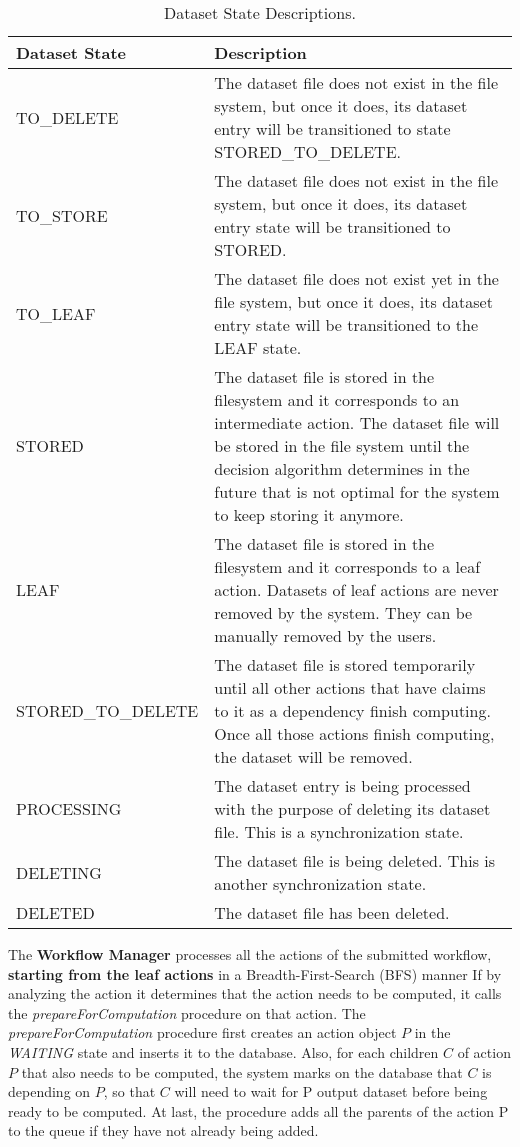 \begin{table}
\begin{tabular}{| l | p{12cm} |}
\hline
\textbf{Dataset State} & \textbf{Description} \\ \hline
TO\_DELETE & The dataset file does not exist in the file system, but once it does, its dataset entry will be transitioned to state STORED\_TO\_DELETE. \\ \hline
TO\_STORE & The dataset file does not exist in the file system, but once it does, its dataset entry state will be transitioned to STORED. \\ \hline
TO\_LEAF & The dataset file does not exist yet in the file system, but once it does, its dataset entry state will be transitioned to the LEAF state. \\ \hline
STORED & The dataset file is stored in the filesystem and it corresponds to an intermediate action. The dataset file will be stored in the file system until the decision algorithm determines in the future that is not optimal for the system to keep storing it anymore. \\ \hline
LEAF & The dataset file is stored in the filesystem and it corresponds to a leaf action. Datasets of leaf actions are never removed by the system. They can be manually removed by the users. \\ \hline
STORED\_TO\_DELETE & The dataset file is stored temporarily until all other actions that have claims to it as a dependency finish computing. Once all those actions finish computing, the dataset will be removed. \\ \hline
PROCESSING & The dataset entry is being processed with the purpose of deleting its dataset file. This is a synchronization state. \\ \hline
DELETING & The dataset file is being deleted. This is another synchronization state. \\ \hline
DELETED & The dataset file has been deleted. \\ \hline
\end{tabular}
\caption{Dataset State Descriptions.\label{tab:dataset_states}}
\end{table}

The \textbf{Workflow Manager} processes all the actions of the submitted workflow, \textbf{starting from the leaf actions} in a Breadth-First-Search (BFS) manner If by analyzing the action it determines that the action needs to be computed, it calls the \textit{prepareForComputation} procedure on that action.  The \textit{prepareForComputation} procedure first creates an action object $P$ in the \textit{WAITING} state and inserts it to the database. Also, for each children $C$ of action $P$ that also needs to be computed, the system marks on the database that $C$ is depending on $P$, so that $C$ will need to wait for P output dataset before being ready to be computed. At last, the procedure adds all the parents of the action P to the queue if they have not already being added.

